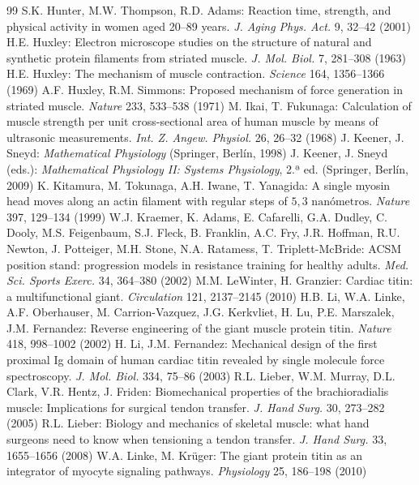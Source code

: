 \documentclass[12pt]{book}
\begin{document}
\begin{thebibliography}{99}
   S.K. Hunter, M.W. Thompson, R.D. Adams: Reaction time, strength, and physical activity in women aged 20--89 years. \textit{J. Aging Phys. Act.} 9, 32--42 (2001)
   H.E. Huxley: Electron microscope studies on the structure of natural and synthetic protein filaments from striated muscle. \textit{J. Mol. Biol.} 7, 281--308 (1963)
   H.E. Huxley: The mechanism of muscle contraction. \textit{Science} 164, 1356--1366 (1969)
   A.F. Huxley, R.M. Simmons: Proposed mechanism of force generation in striated muscle. \textit{Nature} 233, 533--538 (1971)
   M. Ikai, T. Fukunaga: Calculation of muscle strength per unit cross-sectional area of human muscle by means of ultrasonic measurements. \textit{Int. Z. Angew. Physiol.} 26, 26--32 (1968)
   J. Keener, J. Sneyd: \textit{Mathematical Physiology} (Springer, Berlín, 1998)
   J. Keener, J. Sneyd (eds.): \textit{Mathematical Physiology II: Systems Physiology}, 2.ª ed. (Springer, Berlín, 2009)
   K. Kitamura, M. Tokunaga, A.H. Iwane, T. Yanagida: A single myosin head moves along an actin filament with regular steps of $5{,}3\text{ nanómetros}$. \textit{Nature} 397, 129--134 (1999)
   W.J. Kraemer, K. Adams, E. Cafarelli, G.A. Dudley, C. Dooly, M.S. Feigenbaum, S.J. Fleck, B. Franklin, A.C. Fry, J.R. Hoffman, R.U. Newton, J. Potteiger, M.H. Stone, N.A. Ratamess, T. Triplett-McBride: ACSM position stand: progression models in resistance training for healthy adults. \textit{Med. Sci. Sports Exerc.} 34, 364--380 (2002)
   M.M. LeWinter, H. Granzier: Cardiac titin: a multifunctional giant. \textit{Circulation} 121, 2137--2145 (2010)
   H.B. Li, W.A. Linke, A.F. Oberhauser, M. Carrion-Vazquez, J.G. Kerkvliet, H. Lu, P.E. Marszalek, J.M. Fernandez: Reverse engineering of the giant muscle protein titin. \textit{Nature} 418, 998--1002 (2002)
   H. Li, J.M. Fernandez: Mechanical design of the first proximal Ig domain of human cardiac titin revealed by single molecule force spectroscopy. \textit{J. Mol. Biol.} 334, 75--86 (2003)
   R.L. Lieber, W.M. Murray, D.L. Clark, V.R. Hentz, J. Friden: Biomechanical properties of the brachioradialis muscle: Implications for surgical tendon transfer. \textit{J. Hand Surg.} 30, 273--282 (2005)
   R.L. Lieber: Biology and mechanics of skeletal muscle: what hand surgeons need to know when tensioning a tendon transfer. \textit{J. Hand Surg.} 33, 1655--1656 (2008)
   W.A. Linke, M. Krüger: The giant protein titin as an integrator of myocyte signaling pathways. \textit{Physiology} 25, 186--198 (2010)

\end{thebibliography}
\end{document}
